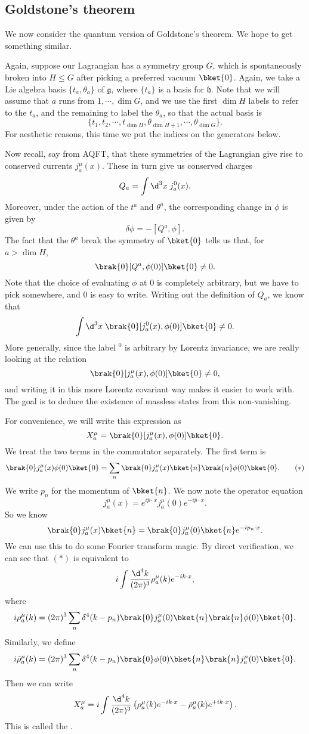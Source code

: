 \documentclass[a4paper]{article}
\begin{document}
\subsection{Goldstone's theorem}
We now consider the quantum version of Goldstone's theorem. We hope to get something similar.

Again, suppose our Lagrangian has a symmetry group $G$, which is spontaneously broken into $H \leq G$ after picking a preferred vacuum $\bket{0}$. Again, we take a Lie algebra basis $\{t_a, \theta_a\}$ of $\mathfrak{g}$, where $\{t_a\}$ is a basis for $\mathfrak{h}$. Note that we will assume that $a$ runs from $1, \cdots, \dim G$, and we use the first $\dim H$ labels to refer to the $t_a$, and the remaining to label the $\theta_a$, so that the actual basis is
\[
  \{t_1, t_2, \cdots, t_{\dim H}, \theta_{\dim H + 1}, \cdots, \theta_{\dim G}\}.
\]
For aesthetic reasons, this time we put the indices on the generators below.

Now recall, say from AQFT, that these symmetries of the Lagrangian give rise to conserved currents $j_a^\mu(x)$. These in turn give us conserved charges
\[
  Q_a = \int \d^3 x\; j^0_a (x).
\]
Moreover, under the action of the $t^a$ and $\theta^a$, the corresponding change in $\phi$ is given by
\[
  \delta \phi = -[Q^a, \phi].
\]
The fact that the $\theta^a$ break the symmetry of $\bket{0}$ tells us that, for $a > \dim H$,
\[
  \brak{0}[Q^a, \phi(0)] \bket{0} \not= 0.
\]
Note that the choice of evaluating $\phi$ at $0$ is completely arbitrary, but we have to pick somewhere, and $0$ is easy to write. Writing out the definition of $Q_a$, we know that
\[
  \int \d^3 x\; \brak{0} [j_a^0(x), \phi(0)] \bket{0} \not= 0.
\]
More generally, since the label $^0$ is arbitrary by Lorentz invariance, we are really looking at the relation
\[
  \brak{0} [j_a^\mu (x), \phi(0)] \bket{0} \not= 0,
\]
and writing it in this more Lorentz covariant way makes it easier to work with. The goal is to deduce the existence of massless states from this non-vanishing.

For convenience, we will write this expression as
\[
  X_a^\mu = \brak{0} [j_a^\mu (x), \phi(0)] \bket{0}.
\]
We treat the two terms in the commutator separately. The first term is
\[
  \brak{0} j_a^\mu (x) \phi(0) \bket{0} = \sum_n \brak{0}j_a^\mu (x) \bket{n} \brak{n}\phi(0) \bket{0}.\tag{$*$}
\]
We write $p_n$ for the momentum of $\bket{n}$. We now note the operator equation
\[
  j_a^\mu (x) = e^{i\hat{p} \cdot x} j_a^\mu (0) e^{-i\hat{p} \cdot x}.
\]
So we know
\[
  \brak{0}j_a^\mu(x) \bket{n} = \brak{0} j_a^\mu(0) \bket{n} e^{-ip_n \cdot x}.
\]
We can use this to do some Fourier transform magic. By direct verification, we can see that $(*)$ is equivalent to
\[
  i \int \frac{\d^4 k}{(2\pi)^3} \rho_a^\mu(k) e^{-ik\cdot x},
\]
where
\[
  i \rho_a^\mu (k) = (2\pi)^3 \sum_n \delta^4(k - p_n)\brak{0}j_a^\mu(0) \bket{n} \brak{n}\phi(0)\bket{0}.
\]
Similarly, we define
\[
  i \tilde{\rho}_a^\mu (k) = (2\pi)^3 \sum_n \delta^4(k - p_n) \brak{0} \phi(0) \bket{n} \brak{n} j_a^\mu (0) \bket{0}.
\]
Then we can write
\[
  X_a^\mu = i \int \frac{\d^4 k}{(2\pi)^3}\left(\rho_a^\mu (k) e^{-ik\cdot x} - \tilde{\rho}_a^\mu(k) e^{+ik\cdot x}\right).
\]
This is called the .
\end{document}
